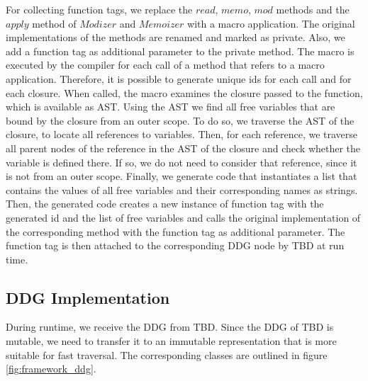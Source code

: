 For collecting function tags, we replace the $read$, $memo$, $mod$ methods and the $apply$ method of $Modizer$ and $Memoizer$ with a macro application. The original implementations of the methods are renamed and marked as private. Also, we add a function tag as additional parameter to the private method. The macro is executed by the compiler for each call of a method that refers to a macro application. Therefore, it is possible to generate unique ids for each call and for each closure. When called, the macro examines the closure passed to the function, which is available as AST. Using the AST we find all free variables that are bound by the closure from an outer scope. To do so, we traverse the AST of the closure, to locate all references to variables. Then, for each reference, we traverse all parent nodes of the reference in the AST of the closure and check whether the variable is defined there. If so, we do not need to consider that reference, since it is not from an outer scope. Finally, we generate code that instantiates a list that contains the values of all free variables and their corresponding names as strings. Then, the generated code creates a new instance of function tag with the generated id and the list of free variables and calls the original implementation of the corresponding method with the function tag as additional parameter. The function tag is then attached to the corresponding DDG node by TBD at run time. 

\subsection{DDG Implementation}

During runtime, we receive the DDG from TBD. Since the DDG of TBD is mutable, we need to transfer it to an immutable representation that is more suitable for fast traversal. The corresponding classes are outlined in figure \ref{fig:framework_ddg}. 

